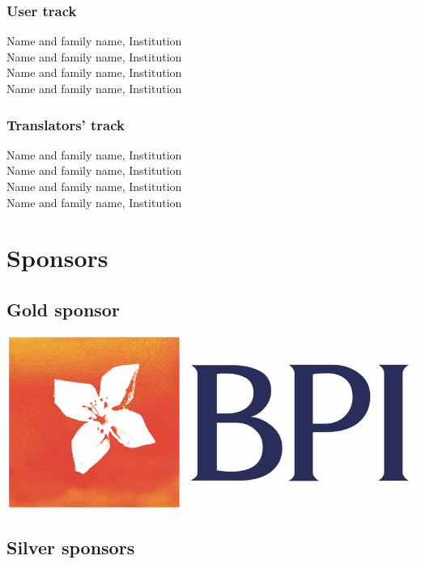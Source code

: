 \documentclass[a4paper,11pt,twoside]{book}
\begin{document}
\subsection*{User track}
\noindent Name and family name, Institution\\
\noindent Name and family name, Institution\\
\noindent Name and family name, Institution\\
\noindent Name and family name, Institution

\subsection*{Translators' track}
\noindent Name and family name, Institution\\
\noindent Name and family name, Institution\\
\noindent Name and family name, Institution\\
\noindent Name and family name, Institution

\chapter*{Sponsors}

\section*{Gold sponsor}

\vfill

\begin{center}
\includegraphics[width=1\columnwidth]{logos/bpi-logo.png}
\end{center}

\vfill

\section*{Silver sponsors}
\end{document}

